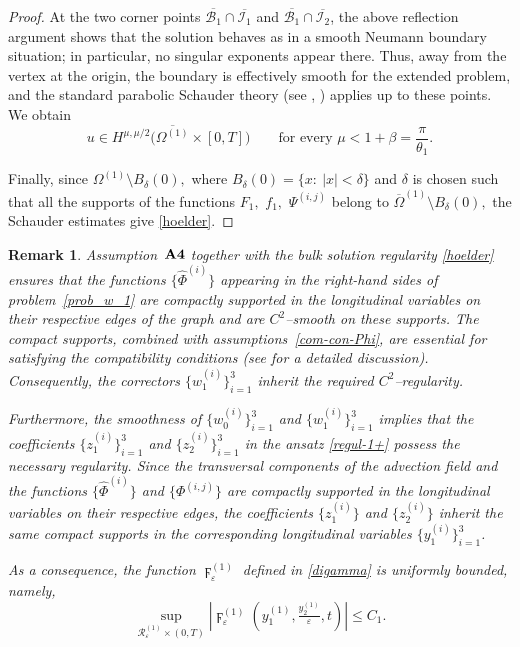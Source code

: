 \documentclass[reqno]{amsart}            %
\newtheorem{remark}{Remark}[section]
\numberwithin{equation}{section}
\begin{document}
\begin{proof}
		At the two corner points 
		$\overline{\mathcal{B}_1}\cap\overline{\mathcal{I}_1}$ and 
		$\overline{\mathcal{B}_1}\cap\overline{\mathcal{I}_2}$, 
		the above reflection argument shows that the solution behaves as in a smooth Neumann 
		boundary situation; in particular, no singular exponents appear there.  
		Thus, away from the vertex at the origin, the boundary is effectively smooth for the 
		extended problem, and the standard parabolic Schauder theory 
		(see \cite[Ch.~IV]{LSU}, \cite[Ch.~IV]{Lieberman}) applies up to these points.  
		We obtain	
		\[
		u\in H^{\mu,\mu/2}\big(\overline{\Omega^{(1)}}\times[0,T]\big)
		\qquad\text{for every }\mu<1+\beta = \frac{\pi}{\theta_1}.
		\]
		
		Finally, since $\Omega^{(1)}\setminus B_\delta(0),$ where $B_\delta(0) = \{x\colon \ |x| < \delta\}$ and
		$\delta$ is chosen such that all the supports of the functions $F_1,$ $f_1,$ $\Psi^{(i,j)}$ belong to $\overline{\Omega}^{(1)}\setminus B_\delta(0),$ the Schauder estimates give \eqref{hoelder}.	
	\end{proof}
	
	
	\begin{remark}\label{rem-2-3}
		Assumption~${\bf A4}$ together with the bulk solution regularity
		\eqref{hoelder} ensures that the functions $\{\widehat{\Phi}^{(i)}\}$ appearing
		in the right-hand sides of problem~\eqref{prob_w_1} are compactly supported in
		the longitudinal variables on their respective edges of the graph and are
		$C^2$–smooth on these supports.  
		The compact supports, combined with assumptions~\eqref{com-con-Phi}, are
		essential for satisfying the compatibility conditions (see
		\cite[\S 3.2.1]{Mel-Roh_AA-2024} for a detailed discussion).  
		Consequently, the correctors $\{w^{(i)}_1\}_{i=1}^3$ inherit the required
		$C^2$–regularity.
		
		Furthermore, the smoothness of $\{w^{(i)}_0\}_{i=1}^3$ and
		$\{w^{(i)}_1\}_{i=1}^3$ implies that the coefficients
		$\{z^{(i)}_1\}_{i=1}^3$ and $\{z^{(i)}_2\}_{i=1}^3$ in the ansatz
		\eqref{regul-1+} possess the necessary regularity.  
		Since the transversal components of the advection field and the functions
		$\{\widehat{\Phi}^{(i)}\}$ and $\{\Phi^{(i,j)}\}$ are compactly supported in
		the longitudinal variables on their respective edges, the coefficients
		$\{z^{(i)}_1\}$ and $\{z^{(i)}_2\}$ inherit the same compact supports in the
		corresponding longitudinal variables $\{y^{(i)}_1\}_{i=1}^3$.
		
		As a consequence, the function $\digamma_\varepsilon^{(1)}$ defined in
		\eqref{digamma} is uniformly bounded, namely,
		\begin{equation}\label{uniform-est-1}
			\sup_{\mathcal{R}_\varepsilon^{(1)}\times(0,T)}
			\left|\digamma_\varepsilon^{(1)}\!\left(y^{(1)}_1,
			\tfrac{y^{(1)}_2}{\varepsilon}, t\right)\right| \le C_1.
		\end{equation}
	\end{remark}
	
\end{document}

